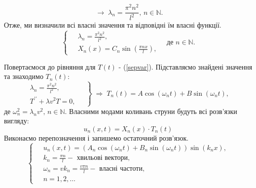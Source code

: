 \documentclass[a4paper, 12pt]{extreport}
\begin{document}
\begin{enumerate}
\begin{enumerate}
\begin{equation*}
            \;\to\;
            \lambda_n = \frac{\pi^2 n^2}{l^2}, \, n \in \mathbb{N}.
        \end{equation*}
        Отже, ми визначили всі власні значення та відповідні їм власні функції.
        \begin{equation}
            \left\{ \begin{aligned}
                \;&\lambda_n = \frac{\pi^2 n^2}{l^2},\\ 
                &X_n(x) = C_n \sin\left(\frac{\pi n x}{l}\right),
            \end{aligned} \right.
            \quad \text{де } n \in \mathbb{N}.
        \end{equation}
    \end{enumerate}
\end{enumerate} 

Повертаємося до рівняння для $T(t)$ - (\ref{sepvar}). Підставляємо знайдені значення та знаходимо $T_n(t)$:
\begin{equation*}
    \left. \begin{aligned}
        \lambda_n = \frac{\pi^2 n^2}{l^2},&\;\\ 
        T^{\prime\prime} + \lambda v^2T = 0,&
    \end{aligned} \right\}
    \;\Rightarrow\;
    T_n(t) = A\cos(\omega_n t) + B\sin(\omega_n t),
\end{equation*}
де $\omega_n^2 = \lambda_n v^2, \, n \in \mathbb{N}.$
Власними модами коливань струни будуть всі розв'язки вигляду:
\begin{equation*}
    u_n(x,t) = X_n(x) \cdot T_n(t)
\end{equation*}
Виконаємо перепозначення і запишемо остаточний розв'язок.
\begin{equation}
    \left\{ \begin{aligned}
        \;&u_n(x,t) = \left(A_n\cos(\omega_n t) + B_n\sin(\omega_n t)\right) \sin(k_n x), \\
        &k_n = \frac{\pi n}{l} - \text{ хвильові вектори}, \\
        &\omega_n = vk_n = \frac{v \pi n}{l} - \text{ власні частоти}, \\
        &n = 1, 2,\ldots
    \end{aligned}\right.
\end{equation}
\end{document}
